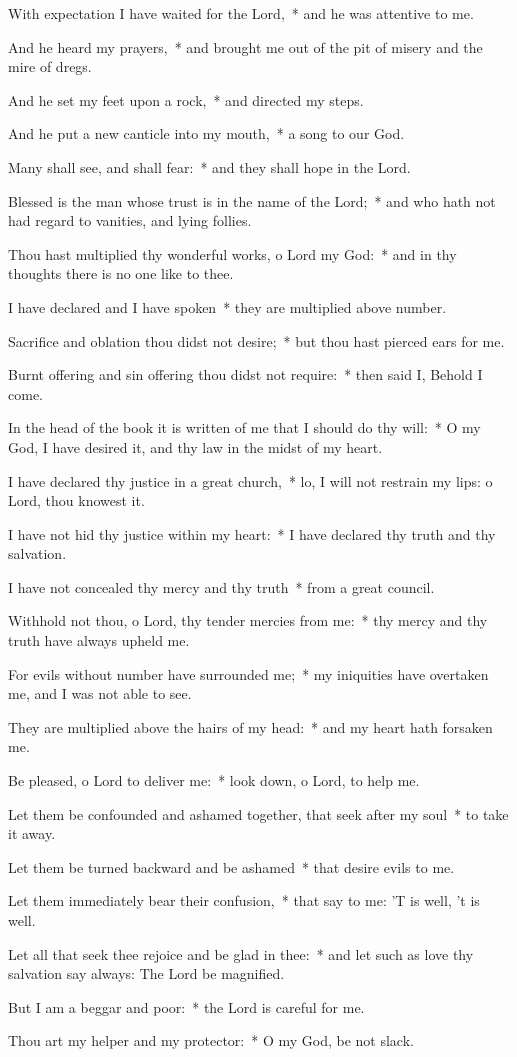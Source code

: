 \begin{enpars}
\item With expectation I have waited for the Lord,~* and he was attentive to me.
\item And he heard my prayers,~* and brought me out of the pit of misery and the mire of dregs.
\item And he set my feet upon a rock,~* and directed my steps.
\item And he put a new canticle into my mouth,~* a song to our God.
\item Many shall see, and shall fear:~* and they shall hope in the Lord.
\item Blessed is the man whose trust is in the name of the Lord;~* and who hath not had regard to vanities, and lying follies.
\item Thou hast multiplied thy wonderful works, o Lord my God:~* and in thy thoughts there is no one like to thee.
\item I have declared and I have spoken~* they are multiplied above number.
\item Sacrifice and oblation thou didst not desire;~* but thou hast pierced ears for me.
\item Burnt offering and sin offering thou didst not require:~* then said I, Behold I come.
\item In the head of the book it is written of me that I should do thy will:~* O my God, I have desired it, and thy law in the midst of my heart.
\item I have declared thy justice in a great church,~* lo, I will not restrain my lips: o Lord, thou knowest it.
\item I have not hid thy justice within my heart:~* I have declared thy truth and thy salvation.
\item I have not concealed thy mercy and thy truth~* from a great council.
\item Withhold not thou, o Lord, thy tender mercies from me:~* thy mercy and thy truth have always upheld me.
\item For evils without number have surrounded me;~* my iniquities have overtaken me, and I was not able to see.
\item They are multiplied above the hairs of my head:~* and my heart hath forsaken me.
\item Be pleased, o Lord to deliver me:~* look down, o Lord, to help me.
\item Let them be confounded and ashamed together, that seek after my soul~* to take it away.
\item Let them be turned backward and be ashamed~* that desire evils to me.
\item Let them immediately bear their confusion,~* that say to me: ’T is well, ’t is well.
\item Let all that seek thee rejoice and be glad in thee:~* and let such as love thy salvation say always: The Lord be magnified.
\item But I am a beggar and poor:~* the Lord is careful for me.
\item Thou art my helper and my protector:~* O my God, be not slack.
\end{enpars}
